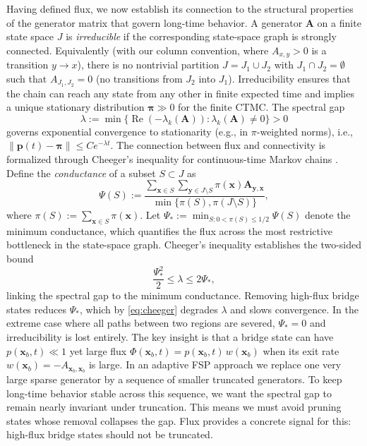 \documentclass[review,onefignum,onetabnum]{siamart171218}
\begin{document}
Having defined flux, we now establish its connection to the structural properties of the generator matrix that govern long-time behavior. A generator $\mathbf{A}$ on a finite state space $J$ is \textit{irreducible} if the corresponding state-space graph is strongly connected. Equivalently (with our column convention, where $A_{x,y}>0$ is a transition $y\!\to\!x$), there is no nontrivial partition $J=J_1\cup J_2$ with $J_1\cap J_2=\emptyset$ such that $A_{J_1,J_2}=0$ (no transitions from $J_2$ into $J_1$). Irreducibility ensures that the chain can reach any state from any other in finite expected time and implies a unique stationary distribution $\boldsymbol{\pi}\gg 0$ for the finite CTMC. The spectral gap
\[
\lambda := \min\{\operatorname{Re}(-\lambda_k(\mathbf{A})):\lambda_k(\mathbf{A})\neq 0\} > 0
\]
governs exponential convergence to stationarity (e.g., in $\pi$-weighted norms), i.e., $\|\boldsymbol{p}(t)-\boldsymbol{\pi}\|\le C e^{-\lambda t}$. The connection between flux and connectivity is formalized through Cheeger's inequality for continuous-time Markov chains \cite{Diaconis1991,63529}. Define the \textit{conductance} of a subset $S \subset J$ as
\begin{equation}
\Psi(S) := \frac{\sum_{\boldsymbol{x} \in S}\sum_{\boldsymbol{y} \in J \setminus S} \pi(\boldsymbol{x}) \mathbf{A}_{\boldsymbol{y},\boldsymbol{x}}}{\min\{\pi(S), \pi(J\setminus S)\}},
\end{equation}
where $\pi(S) := \sum_{\boldsymbol{x} \in S} \pi(\boldsymbol{x})$. Let $\Psi_* := \min_{S: 0 < \pi(S) \leq 1/2} \Psi(S)$ denote the minimum conductance, which quantifies the flux across the most restrictive bottleneck in the state-space graph. Cheeger's inequality establishes the two-sided bound
\begin{equation}
\label{eq:cheeger}
\frac{\Psi_*^2}{2} \leq \lambda \leq 2\Psi_*,
\end{equation}
linking the spectral gap to the minimum conductance. Removing high-flux bridge states reduces $\Psi_*$, which by \eqref{eq:cheeger} degrades $\lambda$ and slows convergence. In the extreme case where all paths between two regions are severed, $\Psi_*=0$ and irreducibility is lost entirely. The key insight is that a bridge state can have $p(\boldsymbol{x}_b,t)\ll 1$ yet large flux $\Phi(\boldsymbol{x}_b,t)=p(\boldsymbol{x}_b,t)\,w(\boldsymbol{x}_b)$ when its exit rate $w(\boldsymbol{x}_b)=-A_{\boldsymbol{x}_b,\boldsymbol{x}_b}$ is large. In an adaptive FSP approach we replace one very large sparse generator by a sequence of smaller truncated generators. To keep long-time behavior stable across this sequence, we want the spectral gap to remain nearly invariant under truncation. This means we must avoid pruning states whose removal collapses the gap. Flux provides a concrete signal for this: high-flux bridge states should not be truncated.
\end{document}
